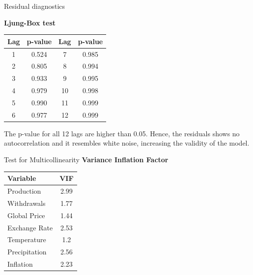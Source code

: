 \documentclass[12pt, aspectratio=169]{beamer}
\begin{document}
\begin{frame}{Residual diagnostics}

    \textbf{Ljung-Box test}
    \begin{center}
                \begin{tabular}{cc|cc}
        \toprule
        Lag  & p-value & Lag & p-value  \\
        \midrule
        1  & 0.524 &  7 & 0.985 \\
        2  & 0.805 &  8 & 0.994 \\
        3  & 0.933 &  9 & 0.995 \\
        4  & 0.979 & 10 & 0.998 \\
        5  & 0.990 & 11 & 0.999 \\
        6  & 0.977 & 12 & 0.999 \\
        \bottomrule
    \end{tabular}
    \end{center}  

    The p-value for all 12 lags are higher than 0.05. Hence, the residuals shows no autocorrelation and it resembles white noise, increasing the validity of the model. 
\end{frame}

\begin{frame}{Test for Multicollinearity}
    \textbf{Variance Inflation Factor}
    \begin{center}
            \begin{tabular}{lc}
        \toprule
        Variable & VIF  \\
        \midrule
      Production  &  2.99 \\
      Withdrawals  &  1.77 \\
      Global Price  &  1.44     \\ 
      Exchange Rate  &   2.53    \\ 
      Temperature  &   1.2    \\ 
      Precipitation  &   2.56   \\
      Inflation &   2.23    \\ 
        \bottomrule
    \end{tabular}
    \end{center}
\end{frame}
\end{document}
